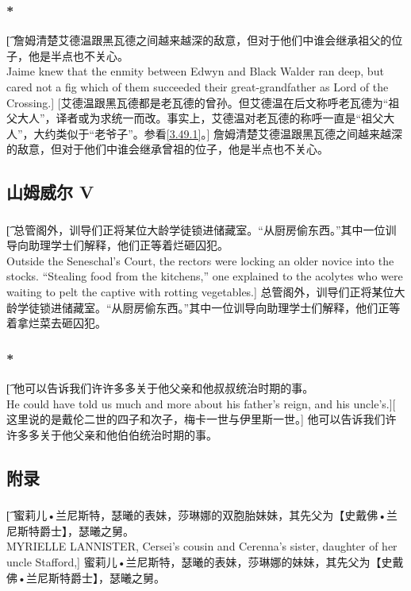 \documentclass[12pt,a4paper]{article}
\begin{document}
\subsubsection{\color{red}*}\label{4.44.1}\t[
詹姆清楚艾德温跟黑瓦德之间越来越深的敌意，但对于他们中谁会继承祖父的位子，他是半点也不关心。\\
Jaime knew that the enmity between Edwyn and Black Walder ran deep, but cared not a fig which of them succeeded their great-grandfather as Lord of the Crossing.]
[艾德温跟黑瓦德都是老瓦德的曾孙。但艾德温在后文称呼老瓦德为“祖父大人”，译者或为求统一而改。事实上，艾德温对老瓦德的称呼一直是“祖父大人”，大约类似于“老爷子”。参看\ref{3.49.1}。]
詹姆清楚艾德温跟黑瓦德之间越来越深的敌意，但对于他们中谁会继承曾祖的位子，他是半点也不关心。
	
\subsection{山姆威尔 V}
\subsubsection{}\t[
	总管阁外，训导们正将某位大龄学徒锁进储藏室。“从厨房偷东西。”其中一位训导向助理学士们解释，他们正等着烂砸囚犯。\\
	Outside the Seneschal's Court, the rectors were locking an older novice into the stocks. “Stealing food from the kitchens,” one explained to the acolytes who were waiting to pelt the captive with rotting vegetables.]
	总管阁外，训导们正将某位大龄学徒锁进储藏室。“从厨房偷东西。”其中一位训导向助理学士们解释，他们正等着拿烂菜去砸囚犯。
	
\subsubsection{\color{red}*}\t[
	他可以告诉我们许许多多关于他父亲和他叔叔统治时期的事。\\
	He could have told us much and more about his father's reign, and his uncle's.][
	这里说的是戴伦二世的四子和次子，梅卡一世与伊里斯一世。]
	他可以告诉我们许许多多关于他父亲和他伯伯统治时期的事。
	
\subsection{附录}
\subsubsection{}\t[
	{\large 蜜莉儿•兰尼斯特}，瑟曦的表妹，莎琳娜的双胞胎妹妹，其先父为【史戴佛•兰尼斯特爵士】，瑟曦之舅。\\
	MYRIELLE LANNISTER, Cersei's cousin and Cerenna's sister, daughter of her uncle Stafford,]
	{\large 蜜莉儿•兰尼斯特}，瑟曦的表妹，莎琳娜的妹妹，其先父为【史戴佛•兰尼斯特爵士】，瑟曦之舅。
	
\end{document}
